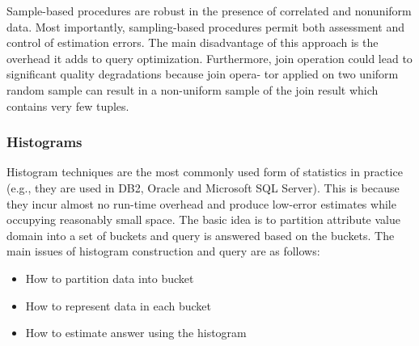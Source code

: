 \documentclass[twocolumn]{article}
\newcommand{\bi}{\begin{itemize}}
\newcommand{\ei}{\end{itemize}}
\newcommand{\ii}{\item}
\begin{document}
Sample-based procedures are robust in the presence of correlated and nonuniform data. Most importantly, sampling-based procedures permit both assessment and control of estimation errors. The main disadvantage of this approach is the overhead it adds to query optimization. 
Furthermore, join operation could lead to significant quality degradations because join opera- tor applied on two uniform random sample can result in a non-uniform sample of the join result which contains very few tuples.

\subsubsection*{Histograms} 
Histogram techniques are the most commonly used form of statistics in practice (e.g., they are used in DB2, Oracle and Microsoft SQL Server). 
This is because they incur almost no run-time overhead and produce low-error estimates while occupying reasonably small space.
The basic idea is to partition attribute value domain into a set of buckets and query is answered based on the buckets. The main issues of histogram construction and query are as follows:

\bi
\ii How to partition data into bucket
\ii How to represent data in each bucket
\ii How to estimate answer using the histogram
\ei
\end{document}
